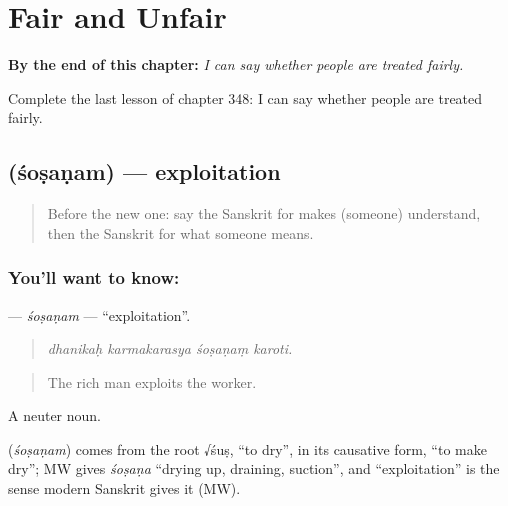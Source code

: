 
\chapter{Fair and Unfair}
\label{ch:sa-fair-and-unfair}

\begin{chapteropening}
\textbf{By the end of this chapter:} \emph{I can say whether people are treated fairly.}

Complete the last lesson of chapter 348: I can say whether people are treated fairly.
\end{chapteropening}

\section[\texorpdfstring{\sk{शोषणम्} (śoṣaṇam)}{शोषणम् (śoṣaṇam)}]{ (śoṣaṇam) — exploitation}

\label{lesson:SA-C348-sosanam}



\begin{quote}
Before the new one: say the Sanskrit for makes (someone) understand, then the Sanskrit for what someone means.
\end{quote}

\subsection*{You'll want to know: }
\textbf{} — \emph{śoṣaṇam} — \textquotedblleft{}exploitation\textquotedblright{}.

\begin{quote}
   
\end{quote}

\begin{quote}
\emph{dhanikaḥ karmakarasya śoṣaṇaṃ karoti.}
\end{quote}

\begin{quote}
The rich man exploits the worker.
\end{quote}

A neuter noun.

\begin{cousinweb}
\textbf{} (\emph{śoṣaṇam}) comes from the root √śuṣ, \textquotedblleft{}to dry\textquotedblright{}, in its causative form, \textquotedblleft{}to make dry\textquotedblright{}; MW gives \emph{śoṣaṇa} \textquotedblleft{}drying up, draining, suction\textquotedblright{}, and \textquotedblleft{}exploitation\textquotedblright{} is the sense modern Sanskrit gives it (MW).
\end{cousinweb}


